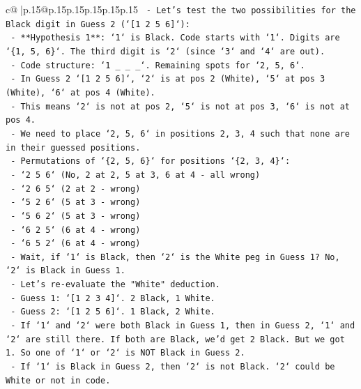 \documentclass{article}
\begin{document}
{\begin{supertabular}{c@{$\;$}|p{.15\linewidth}@{}p{.15\linewidth}p{.15\linewidth}p{.15\linewidth}p{.15\linewidth}p{.15\linewidth}}
{{{\texttt{        {-} Let's test the two possibilities for the Black digit in Guess 2 (`{[}1 2 5 6{]}`):} \\
\texttt{            {-} **Hypothesis 1**: `1` is Black. Code starts with `1`. Digits are `\{1, 5, 6\}`. The third digit is `2` (since `3` and `4` are out).} \\
\texttt{                {-} Code structure: `1 \_ \_ \_`. Remaining spots for `2, 5, 6`.} \\
\texttt{                {-} In Guess 2 `{[}1 2 5 6{]}`, `2` is at pos 2 (White), `5` at pos 3 (White), `6` at pos 4 (White).} \\
\texttt{                {-} This means `2` is not at pos 2, `5` is not at pos 3, `6` is not at pos 4.} \\
\texttt{                {-} We need to place `2, 5, 6` in positions 2, 3, 4 such that none are in their guessed positions.} \\
\texttt{                {-} Permutations of `\{2, 5, 6\}` for positions `\{2, 3, 4\}`:} \\
\texttt{                    {-} `2 5 6` (No, 2 at 2, 5 at 3, 6 at 4 {-} all wrong)} \\
\texttt{                    {-} `2 6 5` (2 at 2 {-} wrong)} \\
\texttt{                    {-} `5 2 6` (5 at 3 {-} wrong)} \\
\texttt{                    {-} `5 6 2` (5 at 3 {-} wrong)} \\
\texttt{                    {-} `6 2 5` (6 at 4 {-} wrong)} \\
\texttt{                    {-} `6 5 2` (6 at 4 {-} wrong)} \\
\texttt{                {-} Wait, if `1` is Black, then `2` is the White peg in Guess 1? No, `2` is Black in Guess 1.} \\
\texttt{                {-} Let's re{-}evaluate the "White" deduction.} \\
\texttt{                {-} Guess 1: `{[}1 2 3 4{]}`. 2 Black, 1 White.} \\
\texttt{                {-} Guess 2: `{[}1 2 5 6{]}`. 1 Black, 2 White.} \\
\texttt{                {-} If `1` and `2` were both Black in Guess 1, then in Guess 2, `1` and `2` are still there. If both are Black, we'd get 2 Black. But we got 1. So one of `1` or `2` is NOT Black in Guess 2.} \\
\texttt{                {-} If `1` is Black in Guess 2, then `2` is not Black. `2` could be White or not in code.} \\
}}}
\end{supertabular}}
\end{document}
